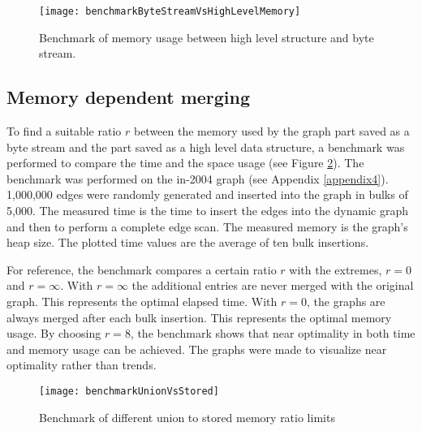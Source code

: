 \begin{figure}[h]
\centering
\texttt{[image: benchmarkByteStreamVsHighLevelMemory]}    
\captionsetup{justification=centering}
\caption {Benchmark of memory usage between high level structure and byte stream. }
\label{fig:benchmarkByteStreamVsHighLevelMemory}
\end{figure}


\subsection{Memory dependent merging} \label{bench:unionVsStored}
To find a suitable ratio $r$ between the memory used by the graph part saved as a byte stream and the part saved as a high level data structure, a benchmark was performed to compare the time and the space usage (see Figure \ref{fig:benchmarkUnionVsStored}). The benchmark was performed on the in-2004 graph (see Appendix \ref{appendix4}). 1,000,000 edges were randomly generated and inserted into the graph in bulks of 5,000. The measured time is the time to insert the edges into the dynamic graph and then to perform a complete edge scan. The measured memory is the graph's heap size. The plotted time values are the average of ten bulk insertions.

For reference, the benchmark compares a certain ratio $r$ with the extremes, $r = 0$ and $r = \infty$. With $r = \infty$ the additional entries are never merged with the original graph. This represents the optimal elapsed time. With $r = 0$, the graphs are always merged after each bulk insertion. This represents the optimal memory usage. By choosing $r = 8$, the benchmark shows that near optimality in both time and memory usage can be achieved. The graphs were made to visualize near optimality rather than trends.

\begin{figure}[h]
\centering
\texttt{[image: benchmarkUnionVsStored]}    
\captionsetup{justification=centering}
\caption {Benchmark of different union to stored memory ratio limits}
\label{fig:benchmarkUnionVsStored}
\end{figure}


\iffalse
